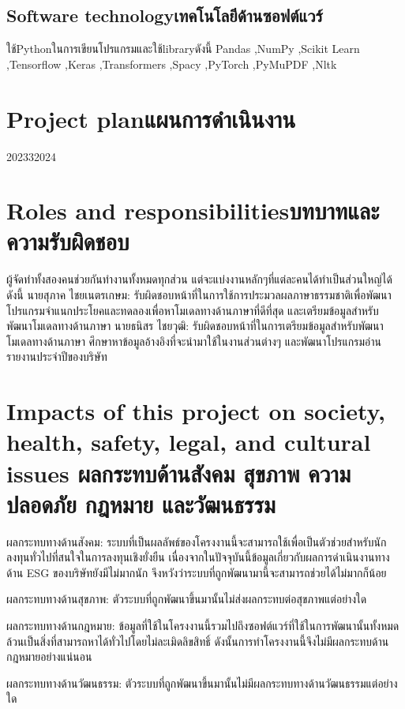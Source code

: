 \subsection{\ifenglish Software technology\else เทคโนโลยีด้านซอฟต์แวร์\fi}

\enskip \enskip \enskip ใช้Pythonในการเขียนโปรแกรมและใช้libraryดังนี้ Pandas ,NumPy ,Scikit Learn ,Tensorflow ,Keras ,Transformers ,Spacy ,PyTorch ,PyMuPDF ,Nltk

\section{\ifenglish Project plan\else แผนการดำเนินงาน\fi}

\begin{plan}{10}{2023}{3}{2024}
\end{plan}

\section{\ifenglish Roles and responsibilities\else บทบาทและความรับผิดชอบ\fi}
\enskip \enskip \enskip ผู้จัดทำทั้งสองคนช่วยกันทำงานทั้งหมดทุกส่วน แต่จะแบ่งงานหลักๆที่แต่ละคนได้ทำเป็นส่วนใหญ่ได้ดังนี้
นายสุภาค ไชยเนตรเกษม: รับผิดชอบหน้าที่ในการใช้การประมวลผลภาษาธรรมชาติเพื่อพัฒนาโปรแกรมจำแนกประโยคและทดลองเพื่อหาโมเดลทางด้านภาษาที่ดีที่สุด และเตรียมข้อมูลสำหรับพัฒนาโมเดลทางด้านภาษา
นายธนิสร ไชยวุฒิ: รับผิดชอบหน้าที่ในการเตรียมข้อมูลสำหรับพัฒนาโมเดลทางด้านภาษา ศึกษาหาข้อมูลอ้างอิงที่จะนำมาใช้ในงานส่วนต่างๆ และพัฒนาโปรแกรมอ่านรายงานประจำปีของบริษัท

\section{\ifenglish%
Impacts of this project on society, health, safety, legal, and cultural issues
\else%
ผลกระทบด้านสังคม สุขภาพ ความปลอดภัย กฎหมาย และวัฒนธรรม
\fi}

\enskip \enskip \enskip ผลกระทบทางด้านสังคม: ระบบที่เป็นผลลัพธ์ของโครงงานนี้จะสามารถใช้เพื่อเป็นตัวช่วยสำหรับนักลงทุนทั่วไปที่สนใจในการลงทุนเชิงยั่งยืน 
เนื่องจากในปัจจุบันนี้ข้อมูลเกี่ยวกับผลการดำเนินงานทางด้าน ESG ของบริษัทยังมีไม่มากนัก 
จึงหวังว่าระบบที่ถูกพัฒนามานี้จะสามารถช่วยได้ไม่มากก็น้อย


ผลกระทบทางด้านสุขภาพ: ตัวระบบที่ถูกพัฒนาขึ้นมานั้นไม่ส่งผลกระทบต่อสุขภาพแต่อย่างใด


ผลกระทบทางด้านกฎหมาย: ข้อมูลที่ใช้ในโครงงานนี้รวมไปถึงซอฟต์แวร์ที่ใช้ในการพัฒนานั้นทั้งหมดล้วนเป็นสิ่งที่สามารถหาได้ทั่วไปโดยไม่ละเมิดลิขสิทธิ์ 
ดังนั้นการทำโครงงานนี้จึงไม่มีผลกระทบด้านกฎหมายอย่างแน่นอน


ผลกระทบทางด้านวัฒนธรรม: ตัวระบบที่ถูกพัฒนาขึ้นมานั้นไม่มีผลกระทบทางด้านวัฒนธรรมแต่อย่างใด
